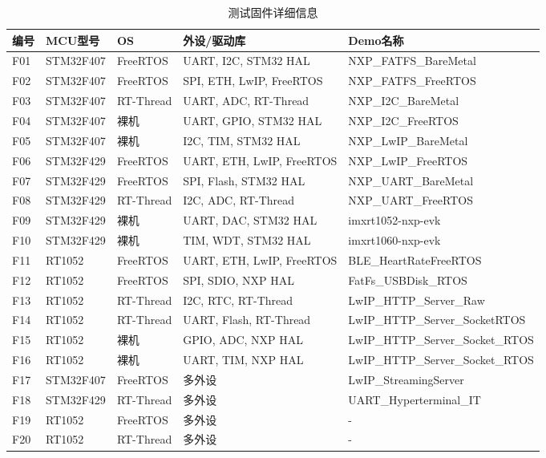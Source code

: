 \begin{table}[htbp]
\centering
\caption{测试固件详细信息}
\label{tab:firmware}
\footnotesize
\begin{tabular}{llllp{3cm}}
\toprule
\textbf{编号} & \textbf{MCU型号} & \textbf{OS} & \textbf{外设/驱动库} & \textbf{Demo名称} \\
\midrule
F01 & STM32F407 & FreeRTOS & UART, I2C, STM32 HAL & NXP\_FATFS\_BareMetal \\
F02 & STM32F407 & FreeRTOS & SPI, ETH, LwIP, FreeRTOS & NXP\_FATFS\_FreeRTOS \\
F03 & STM32F407 & RT-Thread & UART, ADC, RT-Thread & NXP\_I2C\_BareMetal \\
F04 & STM32F407 & 裸机 & UART, GPIO, STM32 HAL & NXP\_I2C\_FreeRTOS \\
F05 & STM32F407 & 裸机 & I2C, TIM, STM32 HAL & NXP\_LwIP\_BareMetal \\
F06 & STM32F429 & FreeRTOS & UART, ETH, LwIP, FreeRTOS & NXP\_LwIP\_FreeRTOS \\
F07 & STM32F429 & FreeRTOS & SPI, Flash, STM32 HAL & NXP\_UART\_BareMetal \\
F08 & STM32F429 & RT-Thread & I2C, ADC, RT-Thread & NXP\_UART\_FreeRTOS \\
F09 & STM32F429 & 裸机 & UART, DAC, STM32 HAL & imxrt1052-nxp-evk \\
F10 & STM32F429 & 裸机 & TIM, WDT, STM32 HAL & imxrt1060-nxp-evk \\
F11 & RT1052 & FreeRTOS & UART, ETH, LwIP, FreeRTOS & BLE\_HeartRateFreeRTOS \\
F12 & RT1052 & FreeRTOS & SPI, SDIO, NXP HAL & FatFs\_USBDisk\_RTOS \\
F13 & RT1052 & RT-Thread & I2C, RTC, RT-Thread & LwIP\_HTTP\_Server\_Raw \\
F14 & RT1052 & RT-Thread & UART, Flash, RT-Thread & LwIP\_HTTP\_Server\_SocketRTOS \\
F15 & RT1052 & 裸机 & GPIO, ADC, NXP HAL & LwIP\_HTTP\_Server\_Socket\_RTOS \\
F16 & RT1052 & 裸机 & UART, TIM, NXP HAL & LwIP\_HTTP\_Server\_Socket\_RTOS \\
F17 & STM32F407 & FreeRTOS & 多外设 & LwIP\_StreamingServer \\
F18 & STM32F429 & RT-Thread & 多外设 & UART\_Hyperterminal\_IT \\
F19 & RT1052 & FreeRTOS & 多外设 & - \\
F20 & RT1052 & RT-Thread & 多外设 & - \\
\bottomrule
\end{tabular}
\end{table}

